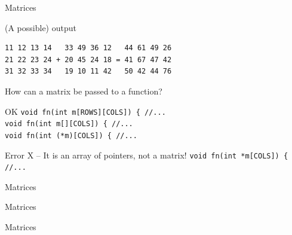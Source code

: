 \documentclass[usenames,dvipsnames,aspectratio=169]{beamer}
\begin{document}
\begin{frame}[fragile]{Matrices}
  \begin{block}{(A possible) output}
    \begin{verbatim}
11 12 13 14   33 49 36 12   44 61 49 26 
21 22 23 24 + 20 45 24 18 = 41 67 47 42 
31 32 33 34   19 10 11 42   50 42 44 76
\end{verbatim}
  \end{block}
  \vfill
  How can a matrix be passed to a function?\\
  \begin{exampleblock}{OK \checkmark}
    \texttt{void fn(int m[ROWS][COLS]) \{ //...\\
    void fn(int m[][COLS]) \{ //...\\
    void fn(int (*m)[COLS]) \{ //...}
  \end{exampleblock}
  \begin{alertblock}{Error X -- It is an array of pointers, not a matrix!}
    \texttt{void fn(int *m[COLS]) \{ //...}
  \end{alertblock}
\end{frame}

\begin{frame}{Matrices}
  \begin{exampleblock}{}
    
  \end{exampleblock}
\end{frame}

\begin{frame}{Matrices}
  \scriptsize
  \begin{exampleblock}{}
    \scriptsize
    \vspace{-.3cm}
    
    \vspace{-.3cm}
  \end{exampleblock}
\end{frame}

\begin{frame}{Matrices}
  \scriptsize
  \begin{exampleblock}{}
    \scriptsize
    
  \end{exampleblock}
\end{frame}
\end{document}
